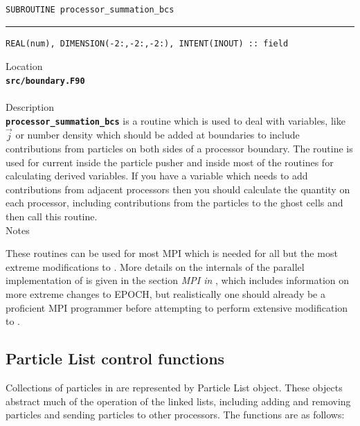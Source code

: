 \documentclass[12pt,a4paper]{article}
\newcommand{\HRule}{\rule{\linewidth}{0.5mm}}
\newcommand{\inlinecode}[1]{{\color{warwickred} \bf\texttt{#1}}}
\newcommand{\EPOCH}{{\color{warwickdark}\fontfamily{phv}\selectfont{EPOCH}}}
\newcommand{\codedef}{\begin{Verbatim}[formatcom=\color{warwickred},fontsize=\Large,hfuzz=0pt]}
\newcommand{\coderule}{
{\color{warwickred}\vspace{-0.5cm}\HRule}
\codedef}
\begin{document}
\pagebreak
\codedef
SUBROUTINE processor_summation_bcs
\end{Verbatim}
\coderule
REAL(num), DIMENSION(-2:,-2:,-2:), INTENT(INOUT) :: field
\end{Verbatim}
\vspace{1cm}
{\Large Location\\}
\inlinecode{src/boundary.F90}\\
\\[0.5cm]
{\Large Description\\}
\inlinecode{processor\_summation\_bcs} is a routine which is used to deal with
variables, like $\vec{j}$ or number density which should be added at boundaries
to include contributions from particles on both sides of a processor
boundary. The routine is used for current inside the particle pusher and inside
most of the routines for calculating derived variables. If you have a variable
which needs to add contributions from adjacent processors then you should
calculate the quantity on each processor, including contributions from the
particles to the ghost cells and then call this routine.
\\[0.5cm]
{\Large Notes\\}
\pagebreak

These routines can be used for most MPI which is needed for all but the most
extreme modifications to \EPOCH. More details on the internals of the parallel
implementation of {\EPOCH} is given in the section {\it MPI in \EPOCH}, which
includes information on more extreme changes to EPOCH, but realistically one
should already be a proficient MPI programmer before attempting to perform
extensive modification to \EPOCH.

\subsection{Particle List control functions}
Collections of particles in {\EPOCH} are represented by Particle List
object. These objects abstract much of the operation of the linked lists,
including adding and removing particles and sending particles to other
processors. The functions are as follows:
\end{document}
